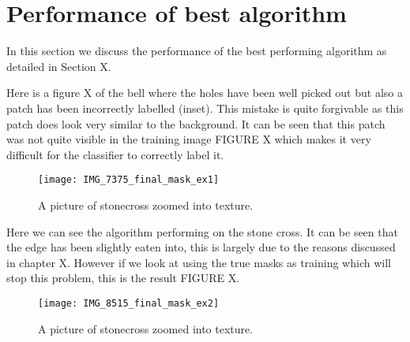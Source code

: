 \documentclass[12pt]{IIBproject}
\begin{document}
\section{Performance of best algorithm}
In this section we discuss the performance of the best performing algorithm as detailed in Section X. 

Here is a figure X of the bell where the holes have been well picked out but also a patch has been incorrectly labelled (inset). This mistake is quite forgivable as this patch does look very similar to the background. It can be seen that this patch was not quite visible in the training image FIGURE X which makes it very difficult for the classifier to correctly label it. 
\begin{figure}[H]
  \caption{A picture of stonecross zoomed into texture.}
  \centering
    \texttt{[image: IMG\_7375\_final\_mask\_ex1]}
\end{figure}

Here we can see the algorithm performing on the stone cross. It can be seen that the edge has been slightly eaten into, this is largely due to the reasons discussed in chapter X. However if we look at using the true masks as training which will stop this problem, this is the result FIGURE X.
\begin{figure}[H]
  \caption{A picture of stonecross zoomed into texture.}
  \centering
    \texttt{[image: IMG\_8515\_final\_mask\_ex2]}
\end{figure}
\end{document}
